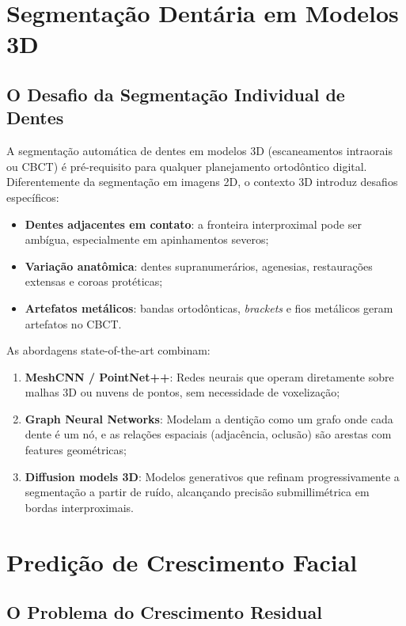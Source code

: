 \section{Segmentação Dentária em Modelos 3D}

\subsection{O Desafio da Segmentação Individual de Dentes}

A segmentação automática de dentes em modelos 3D (escaneamentos intraorais ou CBCT) é pré-requisito para qualquer planejamento ortodôntico digital. Diferentemente da segmentação em imagens 2D, o contexto 3D introduz desafios específicos:
\begin{itemize}
    \item \textbf{Dentes adjacentes em contato}: a fronteira interproximal pode ser ambígua, especialmente em apinhamentos severos;
    \item \textbf{Variação anatômica}: dentes supranumerários, agenesias, restaurações extensas e coroas protéticas;
    \item \textbf{Artefatos metálicos}: bandas ortodônticas, \textit{brackets} e fios metálicos geram artefatos no CBCT.
\end{itemize}

As abordagens state-of-the-art combinam:
\begin{enumerate}
    \item \textbf{MeshCNN / PointNet++}: Redes neurais que operam diretamente sobre malhas 3D ou nuvens de pontos, sem necessidade de voxelização;
    \item \textbf{Graph Neural Networks}: Modelam a dentição como um grafo onde cada dente é um nó, e as relações espaciais (adjacência, oclusão) são arestas com features geométricas;
    \item \textbf{Diffusion models 3D}: Modelos generativos que refinam progressivamente a segmentação a partir de ruído, alcançando precisão submillimétrica em bordas interproximais.
\end{enumerate}

\section{Predição de Crescimento Facial}

\subsection{O Problema do Crescimento Residual}

